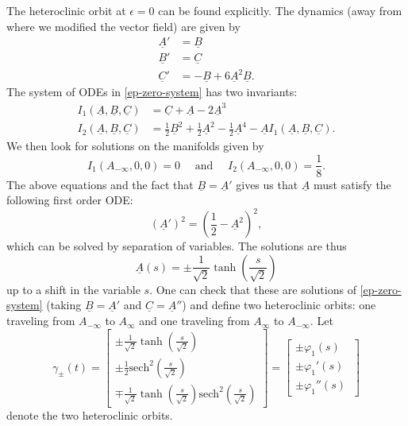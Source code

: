The heteroclinic orbit at \(\epsilon = 0\) can be found explicitly. The dynamics (away from where we modified the vector field) are given by
\begin{equation}\label{ep-zero-system}
	\begin{aligned}
		\underline A ' &= \underline B \\
		\underline B' &= \underline C \\
		\underline C' &= - \underline B + 6 \underline A^2 \underline B.
	\end{aligned}
\end{equation}
The system of ODEs in \cref{ep-zero-system} has two invariants:
\begin{align}
	I_1(\underline A, \underline B, \underline C) &= \underline C + \underline A - 2 \underline A^3 \\
	I_2(\underline A, \underline B, \underline C) &= \frac 1 2 \underline B^2 + \frac 12 \underline A^2 - \frac 1 2 \underline A^4 - \underline A I_1(\underline A, \underline B, \underline C).
\end{align}
We then look for solutions on the manifolds given by
\begin{equation}
	I_1(A_{-\infty}, 0, 0) = 0 \quad \text{ and } \quad I_2(A_{-\infty}, 0, 0) = \frac 1 8.
\end{equation}
The above equations and the fact that \(\underline B = \underline A'\) gives us that \(\underline A\) must satisfy the following first order ODE:
\begin{equation}
	(\underline A')^2 = \left(\frac  1 2 - \underline A^2\right)^2,
\end{equation}
which can be solved by separation of variables. The solutions are thus
\begin{equation}
	\underline A(s) = \pm \frac{1}{\sqrt 2} \tanh\left(\frac s {\sqrt 2} \right)
\end{equation}
up to a shift in the variable \(s\). One can check that these are solutions of \cref{ep-zero-system} (taking \(\underline B = \underline A'\) and \(\underline C = \underline A''\)) and define two heteroclinic orbits: one traveling from \(A_{-\infty}\) to \(A_\infty\) and one traveling from \(A_{\infty}\) to \(A_{-\infty}\). Let
\begin{equation}\label{heteroclinic-orbit-at-zero}
	\gamma_{\pm} (t) = \begin{bmatrix}
		 \pm\frac 1 {\sqrt 2} \tanh\left(\frac s {\sqrt 2}\right) \\
		 \pm\frac 1 2 \mathrm{sech}^2\left( \frac s {\sqrt 2}\right) \\
		 \mp\frac{1}{\sqrt 2 }\tanh\left(\frac s {\sqrt 2 }\right)\mathrm{sech}^2\left(\frac {s}{\sqrt 2}\right)
	\end{bmatrix} = \begin{bmatrix}
	\pm \varphi_1(s)\\
	\pm \varphi_1'(s) \\
	\pm \varphi_1''(s) \
\end{bmatrix}
\end{equation}
denote the two heteroclinic orbits.

